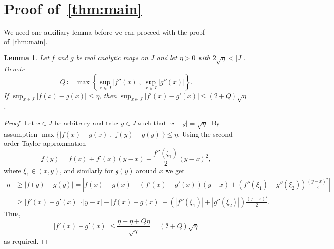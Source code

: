 \documentclass[12pt,]{article}
\newtheorem{lemma}[theorem]{Lemma}
\theoremstyle{definition}
\theoremstyle{remark}
\newcommand{\0}{\mathbf{0}}
\begin{document}
{%
\section{Proof of~\cref{thm:main}}\label{sec:ProofSufficientCond}

We need one auxiliary lemma before we can proceed with the proof of~\cref{thm:main}.

\begin{lemma}\label{thm:analyticity}
Let $f$ and $g$ be real analytic maps on $J$
and let $\eta>0$ with $2\sqrt{\eta}<|J|$.
Denote
 \[
   Q \coloneqq \max\left\{\sup_{x\in J} |f''(x)|,\, \sup_{x\in J}|g''(x)|\right\}.
 \]
If $\sup_{x\in J} |f(x)-g(x)| \leq \eta$, then $\sup_{x\in J} |f'(x)-g'(x)|\leq (2+Q)\sqrt{\eta}$.
\end{lemma}
\begin{proof}
Let $x\in J$ be arbitrary and take $y\in J$ such that $|x-y|=\sqrt{\eta}$. By assumption $\max\{|f(x)-g(x)|,|f(y)-g(y)|\}\leq \eta$. Using the second order Taylor approximation 
\[
  f(y) = f(x) + f'(x)(y-x)+ \frac{f''(\xi_1)}{2}(y-x)^2,
\]
where $\xi_1\in(x,y)$, and similarly for $g(y)$ around $x$ we get
\begin{align*}
  \eta &\geq |f(y)-g(y)| =
  \left|f(x)-g(x)+(f'(x)-g'(x))(y-x)+(f''(\xi_1)-g''(\xi_2))\frac{(y-x)^2}{2}\right|\\
 &\geq |f'(x)-g'(x)|\cdot|y-x|-|f(x)-g(x)|-(|f''(\xi_1)|+|g''(\xi_2)|)\frac{(y-x)^2}{2}.
\end{align*}
  Thus,
  \[
    |f'(x)-g'(x)| \leq \frac{\eta+\eta+Q \eta}{\sqrt{\eta}} = (2+Q)\sqrt{\eta}
  \]
  as required.
\end{proof}


}
\end{document}
